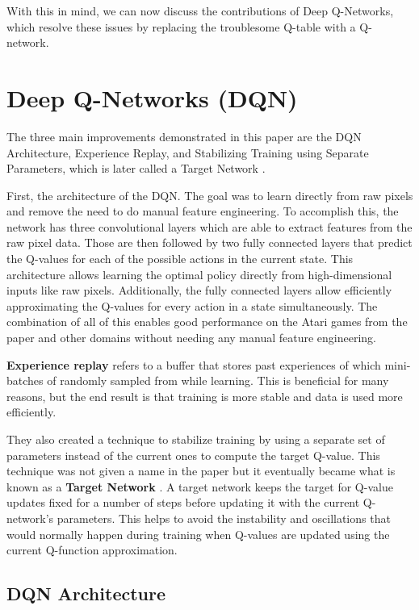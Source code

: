\documentclass{article}
\begin{document}
With this in mind, we can now discuss the contributions of Deep Q-Networks, which resolve these issues by replacing the troublesome Q-table with a Q-network.

\section{Deep Q-Networks (DQN)}

The three main improvements demonstrated in this paper are the DQN Architecture, Experience Replay, and Stabilizing Training using Separate Parameters, which is later called a Target Network  \cite{targetNetwork}.

First, the architecture of the DQN. The goal was to learn directly from raw pixels and remove the need to do manual feature engineering.
To accomplish this, the network has three convolutional layers which are able to extract features from the raw pixel data.
Those are then followed by two fully connected layers that predict the Q-values for each of the possible actions in the current state.
This architecture allows learning the optimal policy directly from high-dimensional inputs like raw pixels.
Additionally, the fully connected layers allow efficiently approximating the Q-values for every action in a state simultaneously.
The combination of all of this enables good performance on the Atari games from the paper and other domains without needing any manual feature engineering.

\textbf{Experience replay} refers to a buffer that stores past experiences of which mini-batches of randomly sampled from while learning. This is beneficial for many reasons, but the end result is that training is more stable and data is used more efficiently.

They also created a technique to stabilize training by using a separate set of parameters instead of the current ones to compute the target Q-value. This technique was not given a name in the paper but it eventually became what is known as a \textbf{Target Network} \cite{targetNetwork}. A target network keeps the target for Q-value updates fixed for a number of steps before updating it with the current Q-network’s parameters. This helps to avoid the instability and oscillations that would normally happen during training when Q-values are updated using the current Q-function approximation.

\subsection{DQN Architecture}
\end{document}

